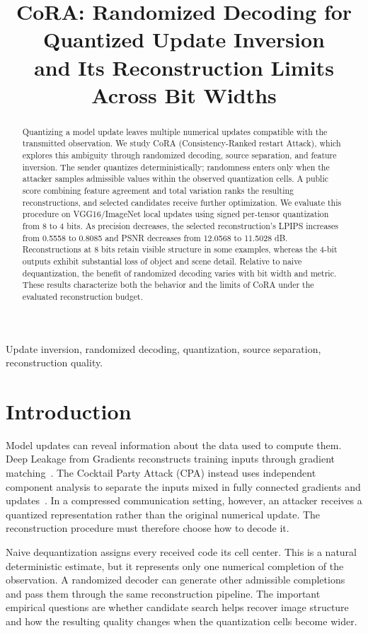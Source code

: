 \documentclass{article}
\title{CoRA: Randomized Decoding for Quantized Update Inversion\\
and Its Reconstruction Limits Across Bit Widths}
\newcommand{\cora}{CoRA}
\begin{document}
\maketitle

\begin{abstract}
Quantizing a model update leaves multiple numerical updates compatible with
the transmitted observation. We study \cora{} (Consistency-Ranked restart
Attack), which explores this ambiguity through randomized decoding,
source separation, and feature inversion. The sender quantizes
deterministically; randomness enters only when the attacker samples
admissible values within the observed quantization cells. A public score
combining feature agreement and total variation ranks the resulting
reconstructions, and selected candidates receive further optimization.
We evaluate this procedure on VGG16/ImageNet local updates using signed
per-tensor quantization from 8 to 4 bits. As precision decreases, the
selected reconstruction's LPIPS increases from 0.5558 to 0.8085 and PSNR
decreases from 12.0568 to 11.5028 dB. Reconstructions at 8 bits retain
visible structure in some examples, whereas the 4-bit outputs exhibit
substantial loss of object and scene detail. Relative to naive
dequantization, the benefit of randomized decoding varies with bit width
and metric. These results characterize both the behavior and the limits
of \cora{} under the evaluated reconstruction budget.
\end{abstract}

\begin{keywords}
Update inversion, randomized decoding,
quantization, source separation, reconstruction quality.
\end{keywords}

\section{Introduction}
\label{sec:intro}
Model updates can reveal information about the data used to compute them.
Deep Leakage from Gradients reconstructs training inputs through gradient
matching~\cite{zhu2019deep}. The Cocktail Party Attack (CPA) instead uses
independent component analysis to separate the inputs mixed in fully
connected gradients and updates~\cite{kariyappa2023cocktail}.
In a compressed communication setting, however, an attacker receives a
quantized representation rather than the original numerical update.
The reconstruction procedure must therefore choose how to decode it.

Naive dequantization assigns every received code its cell center. This is
a natural deterministic estimate, but it represents only one numerical
completion of the observation. A randomized decoder can generate other
admissible completions and pass them through the same reconstruction
pipeline. The important empirical questions are whether candidate search
helps recover image structure and how the resulting quality changes when
the quantization cells become wider.
\end{document}

